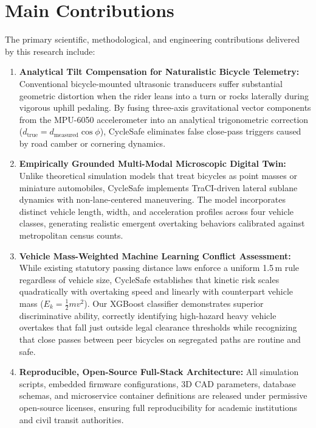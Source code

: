 \section{Main Contributions}
The primary scientific, methodological, and engineering contributions delivered by this research include:
\begin{enumerate}
    \item \textbf{Analytical Tilt Compensation for Naturalistic Bicycle Telemetry:} Conventional bicycle-mounted ultrasonic transducers suffer substantial geometric distortion when the rider leans into a turn or rocks laterally during vigorous uphill pedaling. By fusing three-axis gravitational vector components from the MPU-6050 accelerometer into an analytical trigonometric correction ($d_{\text{true}} = d_{\text{measured}} \cos\phi$), CycleSafe eliminates false close-pass triggers caused by road camber or cornering dynamics.
    \item \textbf{Empirically Grounded Multi-Modal Microscopic Digital Twin:} Unlike theoretical simulation models that treat bicycles as point masses or miniature automobiles, CycleSafe implements TraCI-driven lateral sublane dynamics with non-lane-centered maneuvering. The model incorporates distinct vehicle length, width, and acceleration profiles across four vehicle classes, generating realistic emergent overtaking behaviors calibrated against metropolitan census counts.
    \item \textbf{Vehicle Mass-Weighted Machine Learning Conflict Assessment:} While existing statutory passing distance laws enforce a uniform 1.5\,m rule regardless of vehicle size, CycleSafe establishes that kinetic risk scales quadratically with overtaking speed and linearly with counterpart vehicle mass ($E_k = \frac{1}{2} m v^2$). Our XGBoost classifier demonstrates superior discriminative ability, correctly identifying high-hazard heavy vehicle overtakes that fall just outside legal clearance thresholds while recognizing that close passes between peer bicycles on segregated paths are routine and safe.
    \item \textbf{Reproducible, Open-Source Full-Stack Architecture:} All simulation scripts, embedded firmware configurations, 3D CAD parameters, database schemas, and microservice container definitions are released under permissive open-source licenses, ensuring full reproducibility for academic institutions and civil transit authorities.
\end{enumerate}

